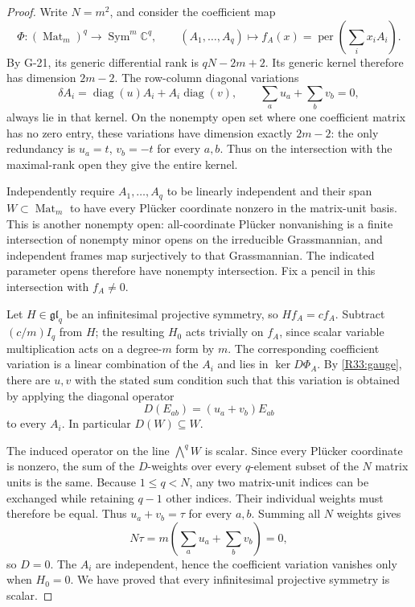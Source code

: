 \begin{proof}
Write $N=m^2$, and consider the coefficient map
\[
 \Phi:(\operatorname{Mat}_m)^q\longrightarrow
               \operatorname{Sym}^m\mathbb C^q,
 \qquad
 (A_1,\ldots,A_q)\longmapsto
             f_A(x)=\operatorname{per}\!\left(\sum_i x_iA_i\right).
\]
By G-21, its generic differential rank is $qN-2m+2$.
Its generic kernel therefore has dimension $2m-2$.
The row-column diagonal variations
\begin{equation}\label{R33:gauge}
 \delta A_i=\operatorname{diag}(u)A_i+A_i\operatorname{diag}(v),
                   \qquad \sum_a u_a+\sum_b v_b=0,
\end{equation}
always lie in that kernel. On the nonempty open set where
one coefficient matrix has no zero entry, these variations
have dimension exactly $2m-2$: the only redundancy is
$u_a=t$, $v_b=-t$ for every $a,b$. Thus on the intersection
with the maximal-rank open they give the entire kernel.

Independently require $A_1,\ldots,A_q$ to be linearly
independent and their span $W\subset\operatorname{Mat}_m$
to have every Pl\"ucker coordinate nonzero in the matrix-unit
basis. This is another nonempty open: all-coordinate Pl\"ucker
nonvanishing is a finite intersection of nonempty minor opens
on the irreducible Grassmannian, and independent frames map
surjectively to that Grassmannian. The indicated parameter
opens therefore have nonempty intersection. Fix a pencil
in this intersection with $f_A\ne0$.

Let $H\in\mathfrak{gl}_q$ be an infinitesimal projective
symmetry, so $Hf_A=c f_A$. Subtract $(c/m)I_q$ from $H$;
the resulting $H_0$ acts trivially on $f_A$, since scalar
variable multiplication acts on a degree-$m$ form by $m$.
The corresponding coefficient variation is a linear
combination of the $A_i$ and lies in $\ker D\Phi_A$.
By \eqref{R33:gauge}, there are $u,v$ with the stated sum
condition such that this variation is obtained by applying
the diagonal operator
\[
 D(E_{ab})=(u_a+v_b)E_{ab}
\]
to every $A_i$. In particular $D(W)\subseteq W$.

The induced operator on the line $\bigwedge^q W$ is scalar.
Since every Pl\"ucker coordinate is nonzero, the sum of the
$D$-weights over every $q$-element subset of the $N$ matrix
units is the same. Because $1\leq q<N$, any two matrix-unit
indices can be exchanged while retaining $q-1$ other indices.
Their individual weights must therefore be equal. Thus
$u_a+v_b=\tau$ for every $a,b$. Summing all $N$ weights gives
\[
 N\tau=m\left(\sum_a u_a+\sum_b v_b\right)=0,
\]
so $D=0$. The $A_i$ are independent, hence the coefficient
variation vanishes only when $H_0=0$. We have proved that
every infinitesimal projective symmetry is scalar.


\end{proof}
